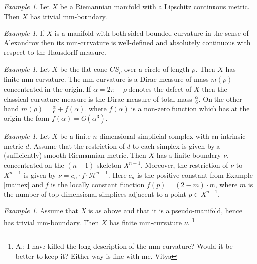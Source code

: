 \documentclass[12pt,leqno]{amsart}
\numberwithin{equation}{section}
\theoremstyle{definition}
\theoremstyle{remark}
\newtheorem{ex}[thm]{Example}
\begin{document}
\begin{ex}
Let $X$ be a Riemannian manifold with a Lipschitz continuous metric.
Then $X$ has  trivial mm-boundary.
\end{ex}


 \begin{ex}
  If $X$ is a manifold with  both-sided bounded curvature in the sense of Alexandrov then its
  mm-curvature   is  well-defined and  absolutely continuous with respect to the Hausdorff measure.
 \end{ex}




\begin{ex} \label{ex:cone}
 Let $X$ be the flat cone $CS_{\rho}$ over a circle of length $\rho$.
  Then $X$ has finite mm-curvature. The mm-curvature is a Dirac measure of mass $m(\rho)$ concentrated in the origin.
  If $\alpha =2\pi-\rho$ denotes the defect of $X$ then the classical curvature measure is the Dirac measure of total mass
  $\frac \alpha 6$.  On the other hand $m(\rho)= \frac \alpha 6 + f(\alpha)$, where
  $f(\alpha)$ is a non-zero function which has at the origin the form $f(\alpha)= O(\alpha ^3)$.
   \end{ex}




 \begin{ex}
 Let $X$ be a finite $n$-dimensional simplicial complex with an intrinsic metric $d$.
 Assume that the restriction of $d$ to each simplex is given by a (sufficiently) smooth Riemannian metric.
 Then $X$ has a finite boundary $\nu$, concentrated on  the $(n-1)$-skeleton $X^{n-1}$.
 Moreover, the restriction of $\nu $ to
 $X^{n-1}$ is given by $\nu= c_n \cdot f \cdot \mathcal H ^{n-1}$.
 Here $c_n$ is the positive constant from Example  \ref{mainex} and  $f$ is the locally constant function $f(p)=(2-m)\cdot m$, where $m$ is the number of top-dimensional simplices
 adjacent to a point $p\in X^{n-1}$.
 \end{ex}


 \begin{ex}
 Assume that $X$ is as above  and that it  is a pseudo-manifold, hence has trivial mm-boundary.
Then $X$ has finite mm-curvature $\nu$. \footnote{A.: I have killed the long description of the mm-curvature?  Would it be better to keep it? {\color{red} Either way is fine with me. Vitya}}
 \end{ex}
\end{document}
